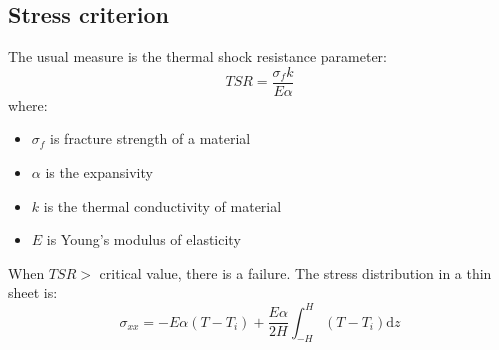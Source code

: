 \subsection{Stress criterion}
The usual measure is the thermal shock resistance parameter:
\begin{equation}
    TSR = \frac{\sigma_fk}{E\alpha}
\end{equation}
where:
\begin{itemize}
    \item $\sigma_f$ is fracture strength of a material
    \item $\alpha$ is the expansivity
    \item $k$ is the thermal conductivity of material
    \item $E$ is Young's modulus of elasticity
\end{itemize}
When $TSR>$ critical value, there is a failure. The stress distribution in a thin sheet is:
\begin{equation}
    \sigma_{xx} = -E\alpha\left(T-T_i\right) + \frac{E\alpha}{2H}\int_{-H}^H\left(T-T_i\right)\textrm{d}z
\end{equation}
